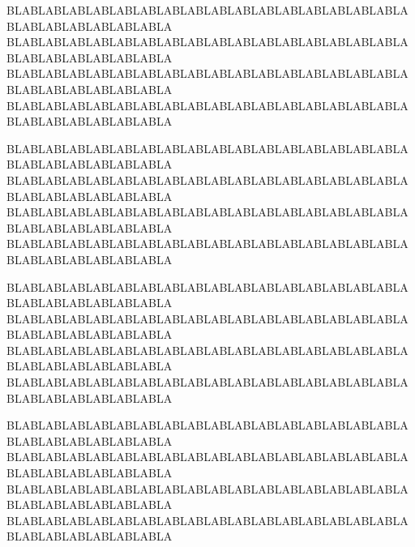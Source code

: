 \documentclass[a4paper, english]{classes/friggeri-letter}
\begin{document}
		   {}
		   {}


	\opening{}{}

		BLABLABLABLABLABLABLABLABLABLABLABLABLABLABLABLABLABLABLABLABLABLABLABLA
		BLABLABLABLABLABLABLABLABLABLABLABLABLABLABLABLABLABLABLABLABLABLABLABLA
		BLABLABLABLABLABLABLABLABLABLABLABLABLABLABLABLABLABLABLABLABLABLABLABLA
		BLABLABLABLABLABLABLABLABLABLABLABLABLABLABLABLABLABLABLABLABLABLABLABLA

		BLABLABLABLABLABLABLABLABLABLABLABLABLABLABLABLABLABLABLABLABLABLABLABLA
		BLABLABLABLABLABLABLABLABLABLABLABLABLABLABLABLABLABLABLABLABLABLABLABLA
		BLABLABLABLABLABLABLABLABLABLABLABLABLABLABLABLABLABLABLABLABLABLABLABLA
		BLABLABLABLABLABLABLABLABLABLABLABLABLABLABLABLABLABLABLABLABLABLABLABLA

		BLABLABLABLABLABLABLABLABLABLABLABLABLABLABLABLABLABLABLABLABLABLABLABLA
		BLABLABLABLABLABLABLABLABLABLABLABLABLABLABLABLABLABLABLABLABLABLABLABLA
		BLABLABLABLABLABLABLABLABLABLABLABLABLABLABLABLABLABLABLABLABLABLABLABLA
		BLABLABLABLABLABLABLABLABLABLABLABLABLABLABLABLABLABLABLABLABLABLABLABLA

		BLABLABLABLABLABLABLABLABLABLABLABLABLABLABLABLABLABLABLABLABLABLABLABLA
		BLABLABLABLABLABLABLABLABLABLABLABLABLABLABLABLABLABLABLABLABLABLABLABLA
		BLABLABLABLABLABLABLABLABLABLABLABLABLABLABLABLABLABLABLABLABLABLABLABLA
		BLABLABLABLABLABLABLABLABLABLABLABLABLABLABLABLABLABLABLABLABLABLABLABLA


	\closing{
		\\
		\firstname\space\lastname
	}
\end{document}
